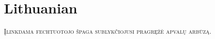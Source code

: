

\presection\section*{\checkno Lithuanian}\postsection

\textsc{Įlinkdama fechtuotojo špaga sublykčiojusi pragręžė apvalų arbūzą.}